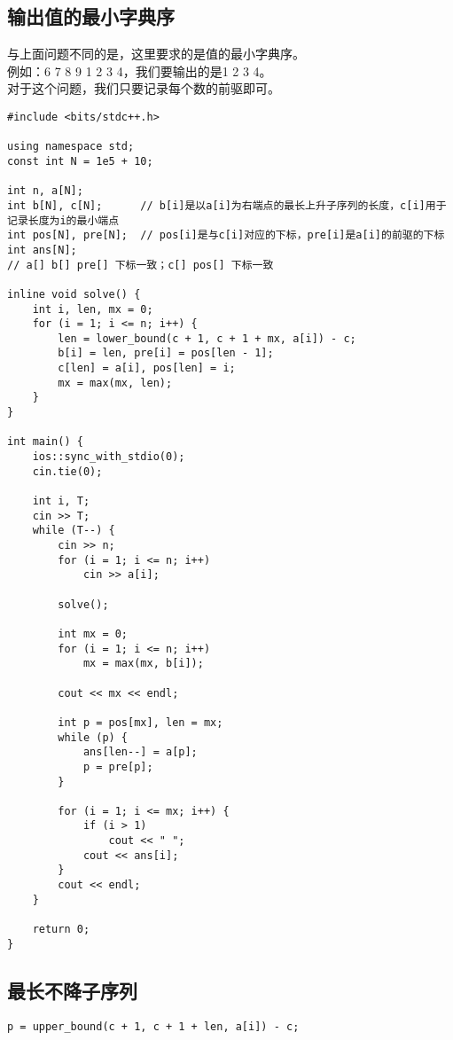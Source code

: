     \subsection{输出值的最小字典序}
        与上面问题不同的是，这里要求的是值的最小字典序。\\
        例如：6 7 8 9 1 2 3 4，我们要输出的是1 2 3 4。\\
        对于这个问题，我们只要记录每个数的前驱即可。
\begin{lstlisting}
#include <bits/stdc++.h>

using namespace std;
const int N = 1e5 + 10;

int n, a[N];
int b[N], c[N];      // b[i]是以a[i]为右端点的最长上升子序列的长度，c[i]用于记录长度为i的最小端点
int pos[N], pre[N];  // pos[i]是与c[i]对应的下标，pre[i]是a[i]的前驱的下标
int ans[N];
// a[] b[] pre[] 下标一致；c[] pos[] 下标一致

inline void solve() {
    int i, len, mx = 0;
    for (i = 1; i <= n; i++) {
        len = lower_bound(c + 1, c + 1 + mx, a[i]) - c;
        b[i] = len, pre[i] = pos[len - 1];
        c[len] = a[i], pos[len] = i;
        mx = max(mx, len);
    }
}

int main() {
    ios::sync_with_stdio(0);
    cin.tie(0);

    int i, T;
    cin >> T;
    while (T--) {
        cin >> n;
        for (i = 1; i <= n; i++)
            cin >> a[i];

        solve();

        int mx = 0;
        for (i = 1; i <= n; i++)
            mx = max(mx, b[i]);

        cout << mx << endl;

        int p = pos[mx], len = mx;
        while (p) {
            ans[len--] = a[p];
            p = pre[p];
        }

        for (i = 1; i <= mx; i++) {
            if (i > 1)
                cout << " ";
            cout << ans[i];
        }
        cout << endl;
    }

    return 0;
}
\end{lstlisting}


    \subsection{最长不降子序列}
\begin{lstlisting}
p = upper_bound(c + 1, c + 1 + len, a[i]) - c;
\end{lstlisting}